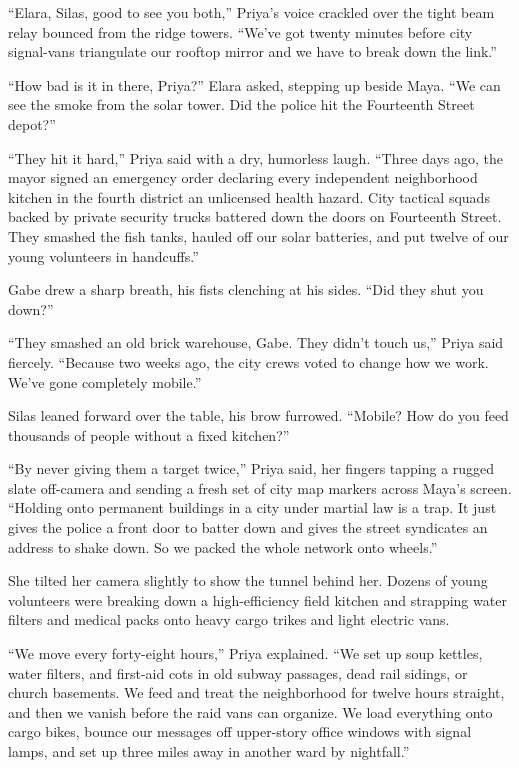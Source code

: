 ``Elara, Silas, good to see you both,'' Priya’s voice crackled over the tight beam relay bounced from the ridge towers. ``We’ve got twenty minutes before city signal-vans triangulate our rooftop mirror and we have to break down the link.''

``How bad is it in there, Priya?'' Elara asked, stepping up beside Maya. ``We can see the smoke from the solar tower. Did the police hit the Fourteenth Street depot?''

``They hit it hard,'' Priya said with a dry, humorless laugh. ``Three days ago, the mayor signed an emergency order declaring every independent neighborhood kitchen in the fourth district an unlicensed health hazard. City tactical squads backed by private security trucks battered down the doors on Fourteenth Street. They smashed the fish tanks, hauled off our solar batteries, and put twelve of our young volunteers in handcuffs.''

Gabe drew a sharp breath, his fists clenching at his sides. ``Did they shut you down?''

``They smashed an old brick warehouse, Gabe. They didn't touch us,'' Priya said fiercely. ``Because two weeks ago, the city crews voted to change how we work. We've gone completely mobile.''

Silas leaned forward over the table, his brow furrowed. ``Mobile? How do you feed thousands of people without a fixed kitchen?''

``By never giving them a target twice,'' Priya said, her fingers tapping a rugged slate off-camera and sending a fresh set of city map markers across Maya's screen. ``Holding onto permanent buildings in a city under martial law is a trap. It just gives the police a front door to batter down and gives the street syndicates an address to shake down. So we packed the whole network onto wheels.''

She tilted her camera slightly to show the tunnel behind her. Dozens of young volunteers were breaking down a high-efficiency field kitchen and strapping water filters and medical packs onto heavy cargo trikes and light electric vans.

``We move every forty-eight hours,'' Priya explained. ``We set up soup kettles, water filters, and first-aid cots in old subway passages, dead rail sidings, or church basements. We feed and treat the neighborhood for twelve hours straight, and then we vanish before the raid vans can organize. We load everything onto cargo bikes, bounce our messages off upper-story office windows with signal lamps, and set up three miles away in another ward by nightfall.''

